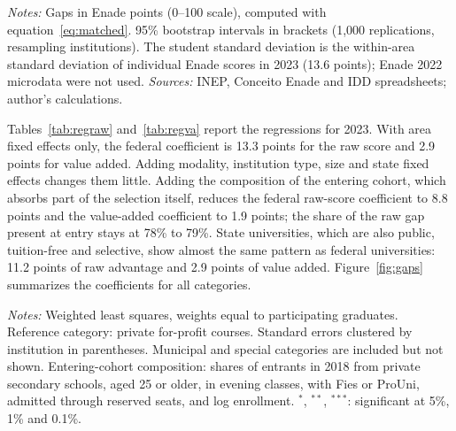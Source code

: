 \documentclass[11pt,a4paper]{article}
\begin{document}
\begin{table}[!htbp]
\centering\small
\caption{Federal minus private courses of the same area, Enade 2022 and 2023}\label{tab:matched}

\begin{minipage}{\linewidth}\vspace{0.4em}\scriptsize
\textit{Notes:} Gaps in Enade points (0--100 scale), computed with equation~\eqref{eq:matched}. 95\% bootstrap intervals in brackets (1,000 replications, resampling institutions). The student standard deviation is the within-area standard deviation of individual Enade scores in 2023 (13.6 points); Enade 2022 microdata were not used. \textit{Sources:} INEP, Conceito Enade and IDD spreadsheets; author's calculations.
\end{minipage}
\end{table}

Tables~\ref{tab:regraw} and~\ref{tab:regva} report the regressions for 2023. With area fixed effects only, the federal coefficient is 13.3 points for the raw score and 2.9 points for value added. Adding modality, institution type, size and state fixed effects changes them little. Adding the composition of the entering cohort, which absorbs part of the selection itself, reduces the federal raw-score coefficient to 8.8 points and the value-added coefficient to 1.9 points; the share of the raw gap present at entry stays at 78\% to 79\%. State universities, which are also public, tuition-free and selective, show almost the same pattern as federal universities: 11.2 points of raw advantage and 2.9 points of value added. Figure~\ref{fig:gaps} summarizes the coefficients for all categories.

\begin{table}[!htbp]
\centering\small
\caption{Raw Enade score: regressions on administrative category, Enade 2023}\label{tab:regraw}

\begin{minipage}{\linewidth}\vspace{0.4em}\scriptsize
\textit{Notes:} Weighted least squares, weights equal to participating graduates. Reference category: private for-profit courses. Standard errors clustered by institution in parentheses. Municipal and special categories are included but not shown. Entering-cohort composition: shares of entrants in 2018 from private secondary schools, aged 25 or older, in evening classes, with Fies or ProUni, admitted through reserved seats, and log enrollment. $^{*}$, $^{**}$, $^{***}$: significant at 5\%, 1\% and 0.1\%.
\end{minipage}
\end{table}
\end{document}
